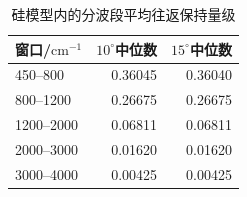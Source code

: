 \begin{table}[htbp]\centering
\caption{硅模型内的分波段平均往返保持量级}\label{tab:si-roundtrip}
\begin{tabular}{lrr}
\toprule
窗口/$\mathrm{cm}^{-1}$ & $10^\circ$中位数 & $15^\circ$中位数\\\midrule
450--800 & 0.36045 & 0.36040\\
800--1200 & 0.26675 & 0.26675\\
1200--2000 & 0.06811 & 0.06811\\
2000--3000 & 0.01620 & 0.01620\\
3000--4000 & 0.00425 & 0.00425\\
\bottomrule
\end{tabular}\end{table}
